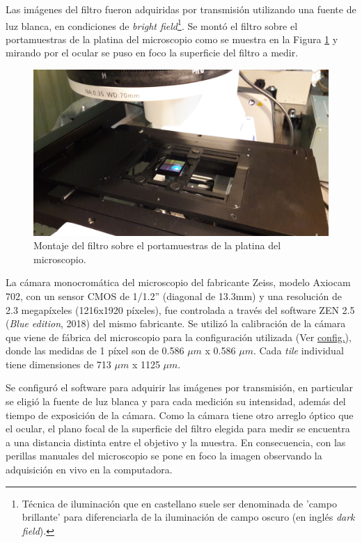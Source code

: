 Las imágenes del filtro fueron adquiridas por transmisión utilizando una fuente de luz blanca, en condiciones de \textit{bright field}\footnote{Técnica de iluminación que en castellano suele ser denominada de 'campo brillante' para diferenciarla de la iluminación de campo oscuro (en inglés \textit{dark field}).}. Se montó el filtro sobre el portamuestras de la platina del microscopio como se muestra en la Figura \ref{fig:filtroenZEISS} y mirando por el ocular se puso en foco la superficie del filtro a medir.  
\begin{figure}[H]
	\centering
	\includegraphics[scale=0.08]{Figs/defectosZEISS/a.jpg}
	\caption{Montaje del filtro sobre el portamuestras de la platina del microscopio.}
	\label{fig:filtroenZEISS}
\end{figure}
La cámara monocromática del microscopio del fabricante Zeiss, modelo Axiocam 702, con un sensor CMOS de 1/1.2'' (diagonal de 13.3mm) y una resolución de 2.3 megapíxeles (1216x1920 píxeles), fue controlada a través del software ZEN 2.5 (\textit{Blue edition}, 2018) del mismo fabricante. Se utilizó la calibración de la cámara que viene de fábrica del microscopio para la configuración utilizada (Ver \hyperref[sec:conf]{config.}), donde las medidas de 1 píxel son de 0.586 $\mu m$ x 0.586 $\mu m$. Cada \textit{tile} individual tiene dimensiones de 713 $\mu m$ x 1125 $\mu m$. 

Se configuró el software para adquirir las imágenes por transmisión, en particular se eligió la fuente de luz blanca y para cada medición su intensidad, además del tiempo de exposición de la cámara. Como la cámara tiene otro arreglo óptico que el ocular, el plano focal de la superficie del filtro elegida para medir se encuentra a una distancia distinta entre el objetivo y la muestra. En consecuencia, con las perillas manuales del microscopio se pone en foco la imagen observando la adquisición en vivo en la computadora. 


